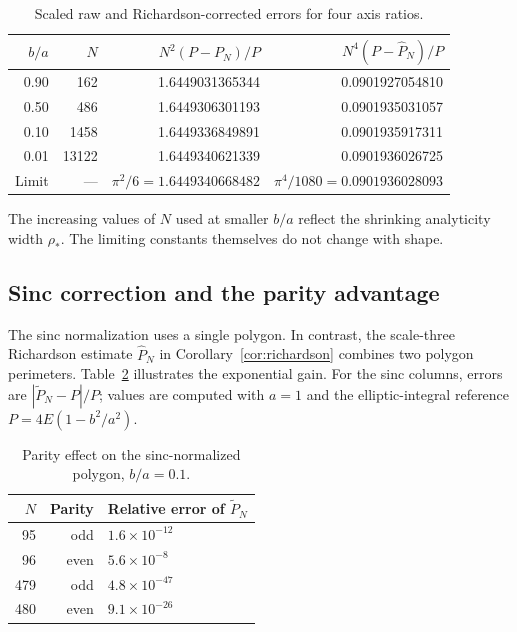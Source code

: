 \documentclass[11pt]{article}
\theoremstyle{definition}
\numberwithin{equation}{section}
\begin{document}
\begin{table}[ht]
\centering
\caption{Scaled raw and Richardson-corrected errors for four axis ratios.}
\label{tab:numerics}
\begin{tabular}{@{}rrrr@{}}
\toprule
\(b/a\) & \(N\) &
\(N^2(P-P_N)/P\) &
\(N^4(P-\widehat P_N)/P\) \\
\midrule
0.90 & 162   & 1.6449031365344 & 0.0901927054810 \\
0.50 & 486   & 1.6449306301193 & 0.0901935031057 \\
0.10 & 1458  & 1.6449336849891 & 0.0901935917311 \\
0.01 & 13122 & 1.6449340621339 & 0.0901936026725 \\
\midrule
Limit & --- &
\(\pi^2/6=1.6449340668482\) &
\(\pi^4/1080=0.0901936028093\) \\
\bottomrule
\end{tabular}
\end{table}

The increasing values of \(N\) used at smaller \(b/a\) reflect the
shrinking analyticity width \(\rho_*\).  The limiting constants
themselves do not change with shape.

\subsection{Sinc correction and the parity advantage}

The sinc normalization uses a single polygon. In contrast, the
scale-three Richardson estimate $\widehat P_N$ in
Corollary~\ref{cor:richardson} combines two polygon perimeters.
Table~\ref{tab:sinc-parity} illustrates the exponential gain. For the
sinc columns, errors are $|\widetilde P_N-P|/P$; values are computed
with $a=1$ and the elliptic-integral reference
$P=4E(1-b^2/a^2)$.
\begin{table}[ht]
\centering
\caption{Parity effect on the sinc-normalized polygon, $b/a=0.1$.}
\label{tab:sinc-parity}
\begin{tabular}{@{}rrl@{}}
\toprule
$N$ & Parity & Relative error of $\widetilde P_N$\\
\midrule
95 & odd & $1.6\times10^{-12}$\\
96 & even & $5.6\times10^{-8}$\\
479 & odd & $4.8\times10^{-47}$\\
480 & even & $9.1\times10^{-26}$\\
\bottomrule
\end{tabular}
\end{table}
\end{document}
